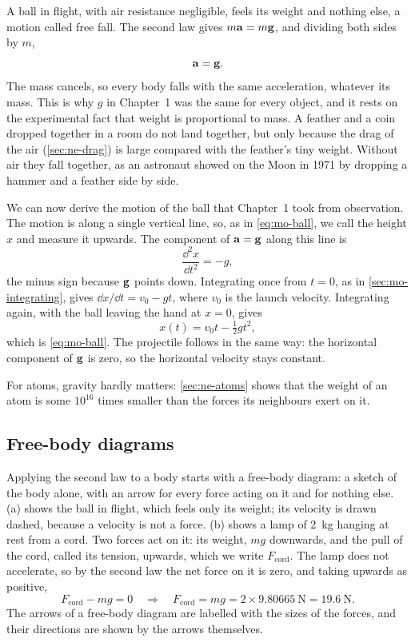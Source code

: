 A ball in flight, with air resistance negligible, feels its weight and
nothing else, a motion called free fall. The second law gives $m\bm{\mathrm{a}} =
m\bm{\mathrm{g}}$, and dividing both sides by $m$,
\begin{equation*}
   \bm{\mathrm{a}} = \bm{\mathrm{g}} .
\end{equation*}
The mass cancels, so every body falls with the same acceleration, whatever
its mass. This is why $g$ in Chapter~1 was the same for every object, and
it rests on the experimental fact that weight is proportional to mass. A
feather and a coin dropped together in a room do not land together, but
only because the drag of the air (\cref{sec:ne-drag}) is large compared
with the feather's tiny weight. Without air they fall together, as an
astronaut showed on the Moon in 1971 by dropping a hammer and a feather
side by side.

We can now derive the motion of the ball that Chapter~1 took from
observation. The motion is along a single vertical line, so, as in
\cref{eq:mo-ball}, we call the height $x$ and measure it upwards. The
component of $\bm{\mathrm{a}} = \bm{\mathrm{g}}$ along this line is
\begin{equation*}
   \frac{\dd^2 x}{\dd t^2} = -g ,
\end{equation*}
the minus sign because $\bm{\mathrm{g}}$ points down. Integrating once from $t =
0$, as in \cref{sec:mo-integrating}, gives $\dd x/\dd t = v_0 - gt$, where
$v_0$ is the launch velocity. Integrating again, with the ball leaving the
hand at $x = 0$, gives
\begin{equation*}
   x(t) = v_0 t - \tfrac12 g t^2 ,
\end{equation*}
which is \cref{eq:mo-ball}. The projectile follows in the same way: the
horizontal component of $\bm{\mathrm{g}}$ is zero, so the horizontal velocity
stays constant.

For atoms, gravity hardly matters: \cref{sec:ne-atoms} shows that the
weight of an atom is some $10^{16}$ times smaller than the forces its
neighbours exert on it.

\subsection*{Free-body diagrams}

Applying the second law to a body starts with a free-body diagram: a
sketch of the body alone, with an arrow for every force acting on it and
for nothing else. (a) shows the ball in flight,
which feels only its weight; its velocity is drawn dashed, because a
velocity is not a force. (b) shows a lamp of
\SI{2}{\kilogram} hanging at rest from a cord. Two forces act on it: its
weight, $mg$ downwards, and the pull of the cord, called its tension,
upwards, which we write $F_{\mathrm{cord}}$. The lamp does not accelerate,
so by the second law the net force on it is zero, and taking upwards as
positive,
\begin{equation*}
   F_{\mathrm{cord}} - mg = 0
   \quad\Longrightarrow\quad
   F_{\mathrm{cord}} = mg = 2\times9.80665\ \si{\newton}
   = \SI{19.6}{\newton} .
\end{equation*}
The arrows of a free-body diagram are labelled with the sizes of the
forces, and their directions are shown by the arrows themselves.

